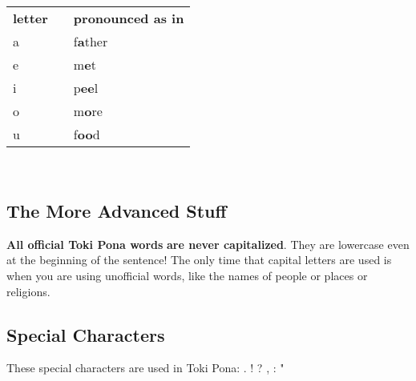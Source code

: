 \begin{supertabular}{p{5,5cm}|ll}
\textbf{letter}   &&    \textbf{pronounced as in} \\ %
a   &&    f\textbf{a}ther \\ %
e   &&    m\textbf{e}t \\ %
i   &&    p\textbf{ee}l \\ %
o   &&    m\textbf{o}re \\ %
u   &&    f\textbf{oo}d \\ %
\end{supertabular} \\
%
\subsection*{The More Advanced Stuff}
%
\textbf{All official Toki Pona words} 
\textbf{are never capitalized}. They are lowercase even at the beginning of the sentence! 
The only time that capital letters are used is when you are using unofficial words, like the names of people or places or religions. 
%
%
\subsection*{Special Characters}
%
These special characters are used in Toki Pona: . ! ? , : "
%

